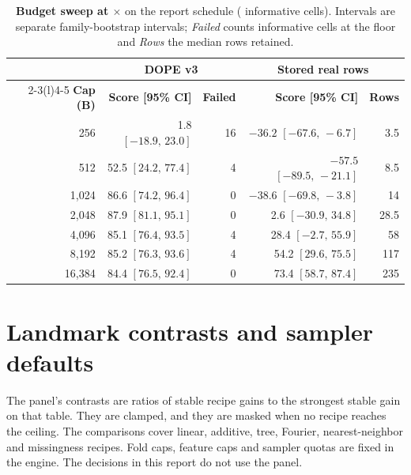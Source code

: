 \documentclass[10pt,letterpaper,twocolumn]{article}
\newcommand{\ct}[1]{{\bfseries\color{ink}#1}}   %
\newcommand{\x}{\ensuremath{\times}}
\newcommand{\thd}[1]{{\sffamily\bfseries\fontsize{7.2}{9}\selectfont\color{ink}#1}}  %
\newcommand{\BudgetRows}{%
256 & 1.8 $[-18.9,\,23.0]$ & 16 & $-36.2$ $[-67.6,\,-6.7]$ & 3.5\\
512 & 52.5 $[24.2,\,77.4]$ & 4 & $-57.5$ $[-89.5,\,-21.1]$ & 8.5\\
1,024 & 86.6 $[74.2,\,96.4]$ & 0 & $-38.6$ $[-69.8,\,-3.8]$ & 14\\
2,048 & 87.9 $[81.1,\,95.1]$ & 0 & 2.6 $[-30.9,\,34.8]$ & 28.5\\
4,096 & 85.1 $[76.4,\,93.5]$ & 4 & 28.4 $[-2.7,\,55.9]$ & 58\\
8,192 & 85.2 $[76.3,\,93.6]$ & 4 & 54.2 $[29.6,\,75.5]$ & 117\\
16,384 & 84.4 $[76.5,\,92.4]$ & 0 & 73.4 $[58.7,\,87.4]$ & 235\\
}
\begin{document}
\begin{table}[H]
\caption{\ct{Budget sweep at \x{}} on the report schedule ( informative cells). Intervals are separate  family-bootstrap intervals; \emph{Failed} counts informative cells at the floor and \emph{Rows} the median rows retained.}\label{tab:budget}
{\fontsize{7.5}{9.6}\selectfont\setlength{\tabcolsep}{3.4pt}
\begin{tabular*}{\columnwidth}{@{\extracolsep{\fill}}rrrrr@{}}
\toprule
 & \multicolumn{2}{c}{\thd{DOPE v3}} & \multicolumn{2}{c}{\thd{Stored real rows}}\\
\cmidrule(lr){2-3}\cmidrule(l){4-5}
\thd{Cap (B)} & \thd{Score [95\% CI]} & \thd{Failed} & \thd{Score [95\% CI]} & \thd{Rows}\\
\midrule
\BudgetRows
\bottomrule
\end{tabular*}}
\end{table}

\section{Landmark contrasts and sampler defaults}\label{app:landmark}
The panel's contrasts are ratios of stable recipe gains to the strongest stable gain on that table.
They are clamped, and they are masked when no recipe reaches the ceiling.
The comparisons cover linear, additive, tree, Fourier, nearest-neighbor and missingness recipes.
Fold caps, feature caps and sampler quotas are fixed in the engine.
The decisions in this report do not use the panel.



\end{document}
